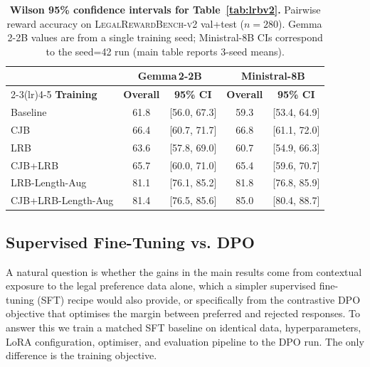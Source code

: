 \documentclass{article}
\theoremstyle{plain}
\theoremstyle{definition}
\theoremstyle{remark}
\begin{document}
\begin{table}[h!]
\centering
\caption{
\textbf{Wilson 95\% confidence intervals for Table~\ref{tab:lrbv2}.}
Pairwise reward accuracy on \textsc{LegalRewardBench-v2} val+test ($n{=}280$).
Gemma\,2-2B values are from a single training seed; Ministral-8B CIs correspond to the seed=42 run (main table reports 3-seed means).
}
\label{tab:table_CI}
\smallskip
\small
\setlength{\tabcolsep}{3pt}
\begin{tabular}{lcc|cc}
\toprule
& \multicolumn{2}{c}{\textbf{Gemma\,2-2B}}
& \multicolumn{2}{c}{\textbf{Ministral-8B}} \\
\cmidrule(lr){2-3}\cmidrule(lr){4-5}
\textbf{Training} & \textbf{Overall} & \textbf{95\% CI}
& \textbf{Overall} & \textbf{95\% CI} \\
\midrule
Baseline         & 61.8 & [56.0, 67.3] & 59.3 & [53.4, 64.9] \\
CJB              & 66.4 & [60.7, 71.7] & 66.8 & [61.1, 72.0] \\
LRB              & 63.6 & [57.8, 69.0] & 60.7 & [54.9, 66.3] \\
CJB+LRB          & 65.7 & [60.0, 71.0] & 65.4 & [59.6, 70.7] \\
\midrule
LRB-Length-Aug   & 81.1 & [76.1, 85.2] & 81.8 & [76.8, 85.9] \\
CJB+LRB-Length-Aug & 81.4 & [76.5, 85.6] & 85.0 & [80.4, 88.7] \\
\bottomrule
\end{tabular}
\end{table}

\subsection{Supervised Fine-Tuning vs. DPO}
\label{app:sft_experiment}

A natural question is whether the gains in the main results come from contextual exposure to the legal preference data alone,  which a simpler supervised fine-tuning (SFT) recipe would also provide,  or specifically from the contrastive DPO objective that optimises the margin between preferred and rejected responses.  To answer this we train a matched SFT baseline on identical data, hyperparameters, LoRA configuration, optimiser, and evaluation pipeline to the DPO run. The only difference is the training objective.
\end{document}

